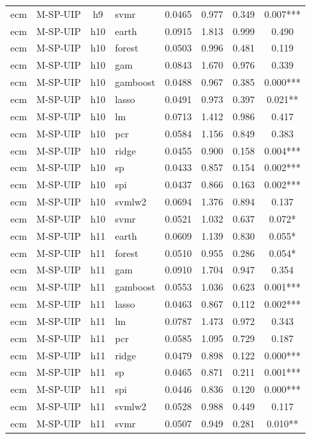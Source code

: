 \begin{ThreePartTable}
\begin{longtable}[t]{llclcccc}
ecm & M-SP-UIP & h9 & svmr & 0.0465 & 0.977 & 0.349 & 0.007***\\
\addlinespace
ecm & M-SP-UIP & h10 & earth & 0.0915 & 1.813 & 0.999 & 0.490\\
ecm & M-SP-UIP & h10 & forest & 0.0503 & 0.996 & 0.481 & 0.119\\
ecm & M-SP-UIP & h10 & gam & 0.0843 & 1.670 & 0.976 & 0.339\\
ecm & M-SP-UIP & h10 & gamboost & 0.0488 & 0.967 & 0.385 & 0.000***\\
ecm & M-SP-UIP & h10 & lasso & 0.0491 & 0.973 & 0.397 & 0.021**\\
ecm & M-SP-UIP & h10 & lm & 0.0713 & 1.412 & 0.986 & 0.417\\
ecm & M-SP-UIP & h10 & pcr & 0.0584 & 1.156 & 0.849 & 0.383\\
ecm & M-SP-UIP & h10 & ridge & 0.0455 & 0.900 & 0.158 & 0.004***\\
ecm & M-SP-UIP & h10 & sp & 0.0433 & 0.857 & 0.154 & 0.002***\\
ecm & M-SP-UIP & h10 & spi & 0.0437 & 0.866 & 0.163 & 0.002***\\
ecm & M-SP-UIP & h10 & svmlw2 & 0.0694 & 1.376 & 0.894 & 0.137\\
ecm & M-SP-UIP & h10 & svmr & 0.0521 & 1.032 & 0.637 & 0.072*\\
\addlinespace
ecm & M-SP-UIP & h11 & earth & 0.0609 & 1.139 & 0.830 & 0.055*\\
ecm & M-SP-UIP & h11 & forest & 0.0510 & 0.955 & 0.286 & 0.054*\\
ecm & M-SP-UIP & h11 & gam & 0.0910 & 1.704 & 0.947 & 0.354\\
ecm & M-SP-UIP & h11 & gamboost & 0.0553 & 1.036 & 0.623 & 0.001***\\
ecm & M-SP-UIP & h11 & lasso & 0.0463 & 0.867 & 0.112 & 0.002***\\
ecm & M-SP-UIP & h11 & lm & 0.0787 & 1.473 & 0.972 & 0.343\\
ecm & M-SP-UIP & h11 & pcr & 0.0585 & 1.095 & 0.729 & 0.187\\
ecm & M-SP-UIP & h11 & ridge & 0.0479 & 0.898 & 0.122 & 0.000***\\
ecm & M-SP-UIP & h11 & sp & 0.0465 & 0.871 & 0.211 & 0.001***\\
ecm & M-SP-UIP & h11 & spi & 0.0446 & 0.836 & 0.120 & 0.000***\\
ecm & M-SP-UIP & h11 & svmlw2 & 0.0528 & 0.988 & 0.449 & 0.117\\
ecm & M-SP-UIP & h11 & svmr & 0.0507 & 0.949 & 0.281 & 0.010**\\

\end{longtable}
\end{ThreePartTable}

